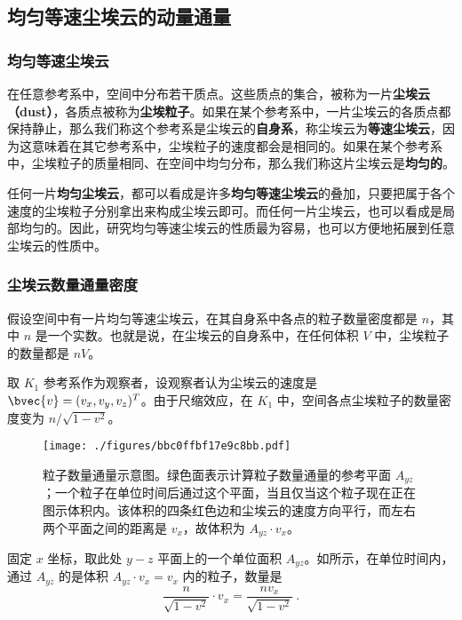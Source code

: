 



\subsection{均匀等速尘埃云的动量通量}

\subsubsection{均匀等速尘埃云}

在任意参考系中，空间中分布若干质点。这些质点的集合，被称为一片\textbf{尘埃云（dust）}，各质点被称为\textbf{尘埃粒子}。如果在某个参考系中，一片尘埃云的各质点都保持静止，那么我们称这个参考系是尘埃云的\textbf{自身系}，称尘埃云为\textbf{等速尘埃云}，因为这意味着在其它参考系中，尘埃粒子的速度都会是相同的。如果在某个参考系中，尘埃粒子的质量相同、在空间中均匀分布，那么我们称这片尘埃云是\textbf{均匀的}。

任何一片\textbf{均匀尘埃云}，都可以看成是许多\textbf{均匀等速尘埃云}的叠加，只要把属于各个速度的尘埃粒子分别拿出来构成尘埃云即可。而任何一片尘埃云，也可以看成是局部均匀的。因此，研究均匀等速尘埃云的性质最为容易，也可以方便地拓展到任意尘埃云的性质中。

\subsubsection{尘埃云数量通量密度}

假设空间中有一片均匀等速尘埃云，在其自身系中各点的粒子数量密度都是 $n$，其中 $n$ 是一个实数。也就是说，在尘埃云的自身系中，在任何体积 $V$ 中，尘埃粒子的数量都是 $nV$。

取 $K_1$ 参考系作为观察者，设观察者认为尘埃云的速度是 $\bvec{v}=(v_x, v_y, v_z)^T$。由于尺缩效应，在 $K_1$ 中，空间各点尘埃粒子的数量密度变为 $n/\sqrt{1-v^2}$。

\begin{figure}[ht]
\centering
\texttt{[image: ./figures/bbc0ffbf17e9c8bb.pdf]}
\caption{粒子数量通量示意图。绿色面表示计算粒子数量通量的参考平面 $A_{yz}$；一个粒子在单位时间后通过这个平面，当且仅当这个粒子现在正在图示体积内。该体积的四条红色边和尘埃云的速度方向平行，而左右两个平面之间的距离是 $v_x$，故体积为 $A_{yz}\cdot v_x$。} \label{fig_SRFld_1}
\end{figure}

固定 $x$ 坐标，取此处 $y-z$ 平面上的一个单位面积 $A_{yz}$。如所示，在单位时间内，通过 $A_{yz}$ 的是体积 $A_{yz}\cdot v_x=v_x$ 内的粒子，数量是
\begin{equation}
\frac{n}{\sqrt{1-v^2}}\cdot v_x=\frac{nv_x}{\sqrt{1-v^2}}~.
\end{equation}

